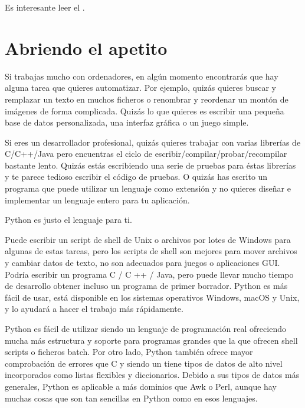 \documentclass[a5paper,10pt,spanish]{sphinxmanual}
\begin{document}
\sphinxAtStartPar
Es interesante leer el {\hyperref[\detokenize{glossary:glossary}]{}}.


\chapter{Abriendo el apetito}
\label{\detokenize{tutorial/appetite:whetting-your-appetite}}\label{\detokenize{tutorial/appetite:tut-intro}}\label{\detokenize{tutorial/appetite::doc}}
\sphinxAtStartPar
Si trabajas mucho con ordenadores, en algún momento encontrarás que hay alguna tarea que quieres automatizar. Por ejemplo, quizás quieres buscar y remplazar un texto en muchos ficheros o renombrar y reordenar un montón de imágenes de forma complicada. Quizás lo que quieres es escribir una pequeña base de datos personalizada, una interfaz gráfica o un juego simple.

\sphinxAtStartPar
Si eres un desarrollador profesional, quizás quieres trabajar con varias librerías de C/C++/Java pero encuentras el ciclo de escribir/compilar/probar/recompilar bastante lento. Quizás estás escribiendo una serie de pruebas para éstas librerías y te parece tedioso escribir el código de pruebas. O quizás has escrito un programa que puede utilizar un lenguaje como extensión y no quieres diseñar e implementar un lenguaje entero para tu aplicación.

\sphinxAtStartPar
Python es justo el lenguaje para ti.

\sphinxAtStartPar
Puede escribir un script de shell de Unix o archivos por lotes de Windows para algunas de estas tareas, pero los scripts de shell son mejores para mover archivos y cambiar datos de texto, no son adecuados para juegos o aplicaciones GUI. Podría escribir un programa C / C ++ / Java, pero puede llevar mucho tiempo de desarrollo obtener incluso un programa de primer borrador. Python es más fácil de usar, está disponible en los sistemas operativos Windows, macOS y Unix, y lo ayudará a hacer el trabajo más rápidamente.

\sphinxAtStartPar
Python es fácil de utilizar siendo un lenguaje de programación real ofreciendo mucha más estructura y soporte para programas grandes que la que ofrecen shell scripts o ficheros batch. Por otro lado, Python también ofrece mayor comprobación de errores que C y siendo un  tiene tipos de datos de alto nivel incorporados como listas flexibles y diccionarios. Debido a sus tipos de datos más generales, Python es aplicable a más dominios que Awk o Perl, aunque hay muchas cosas que son tan sencillas en Python como en esos lenguajes.
\end{document}

